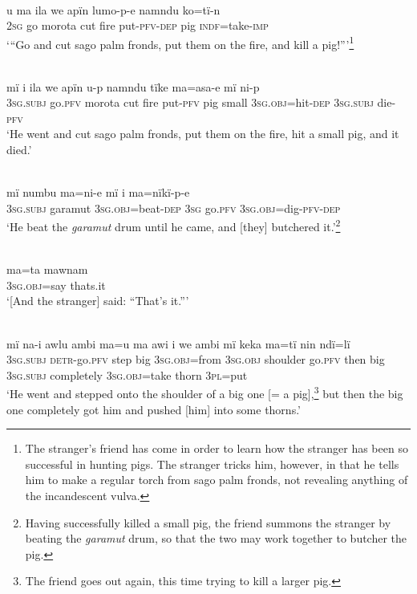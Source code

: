 \\
\gll u    ma  ila    we  apïn  lumo-p-e    namndu  ko=tï-n\\
2\textsc{sg}  go  morota  cut  fire    put-\textsc{pfv-dep}  pig      \textsc{indf}=take-\textsc{imp}\\
\glt ‘“Go and cut sago palm fronds, put them on the fire, and kill a pig!”’\footnote{The stranger’s friend has come in order to learn how the stranger has been so successful in hunting pigs. The stranger tricks him, however, in that he tells him to make a regular torch from sago palm fronds, not revealing anything of the incandescent vulva.}

\\
\gll mï      i    ila    we  apïn  u-p      namndu  tïke ma=asa-e      mï      ni-p\\
3\textsc{sg.subj}  go.\textsc{pfv}  morota  cut  fire    put-\textsc{pfv}  pig      small 3\textsc{sg.obj}=hit-\textsc{dep}  3\textsc{sg.subj}  die-\textsc{pfv}\\
\glt ‘He went and cut sago palm fronds, put them on the fire, hit a small pig, and it died.’

\\
\gll mï      numbu    ma=ni-e      mï    i ma=nïkï-p-e\\
3\textsc{sg.subj}  garamut  3\textsc{sg.obj}=beat-\textsc{dep}  3\textsc{sg}  go.\textsc{pfv} 3\textsc{sg.obj}=dig{}-\textsc{pfv-dep}\\
\glt ‘He beat the \textit{garamut} drum until he came, and [they] butchered it.’\footnote{Having successfully killed a small pig, the friend summons the stranger by beating the \textit{garamut} drum, so that the two may work together to butcher the pig.}

\\
\gll ma=ta      mawnam\\
3\textsc{sg.obj}=say  thats.it\\
\glt ‘[And the stranger] said: “That’s it.”’

\newpage

\\
\gll mï       na-i      awlu  ambi  ma=u      ma      awi i     we    ambi  mï       keka      ma=tï     nin ndï=lï\\
3\textsc{sg.subj}  \textsc{detr-}go.\textsc{pfv}  step  big    3\textsc{sg.obj}=from  3\textsc{sg.obj}  shoulder go.\textsc{pfv}  then  big    3\textsc{sg.subj}  completely  3\textsc{sg.obj}=take  thorn 3\textsc{pl}=put\\
\glt ‘He went and stepped onto the shoulder of a big one [= a pig],\footnote{The friend goes out again, this time trying to kill a larger pig.} but then the big one completely got him and pushed [him] into some thorns.’

